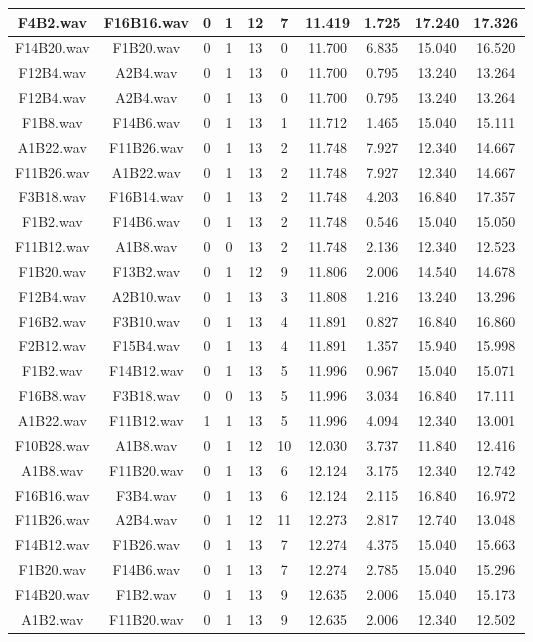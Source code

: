 \documentclass[11pt,a4paper]{book}
\begin{document}
\begin{longtable}[c]{|c|c|c|c|c|c|c|c|c|c|}
F4B2.wav&F16B16.wav&0&1&12&7&11.419&1.725&17.240&17.326\\ \hline
F14B20.wav&F1B20.wav&0&1&13&0&11.700&6.835&15.040&16.520\\ \hline
F12B4.wav&A2B4.wav&0&1&13&0&11.700&0.795&13.240&13.264\\ \hline
F12B4.wav&A2B4.wav&0&1&13&0&11.700&0.795&13.240&13.264\\ \hline
F1B8.wav&F14B6.wav&0&1&13&1&11.712&1.465&15.040&15.111\\ \hline
A1B22.wav&F11B26.wav&0&1&13&2&11.748&7.927&12.340&14.667\\ \hline
F11B26.wav&A1B22.wav&0&1&13&2&11.748&7.927&12.340&14.667\\ \hline
F3B18.wav&F16B14.wav&0&1&13&2&11.748&4.203&16.840&17.357\\ \hline
F1B2.wav&F14B6.wav&0&1&13&2&11.748&0.546&15.040&15.050\\ \hline
F11B12.wav&A1B8.wav&0&0&13&2&11.748&2.136&12.340&12.523\\ \hline
F1B20.wav&F13B2.wav&0&1&12&9&11.806&2.006&14.540&14.678\\ \hline
F12B4.wav&A2B10.wav&0&1&13&3&11.808&1.216&13.240&13.296\\ \hline
F16B2.wav&F3B10.wav&0&1&13&4&11.891&0.827&16.840&16.860\\ \hline
F2B12.wav&F15B4.wav&0&1&13&4&11.891&1.357&15.940&15.998\\ \hline
F1B2.wav&F14B12.wav&0&1&13&5&11.996&0.967&15.040&15.071\\ \hline
F16B8.wav&F3B18.wav&0&0&13&5&11.996&3.034&16.840&17.111\\ \hline
A1B22.wav&F11B12.wav&1&1&13&5&11.996&4.094&12.340&13.001\\ \hline
F10B28.wav&A1B8.wav&0&1&12&10&12.030&3.737&11.840&12.416\\ \hline
A1B8.wav&F11B20.wav&0&1&13&6&12.124&3.175&12.340&12.742\\ \hline
F16B16.wav&F3B4.wav&0&1&13&6&12.124&2.115&16.840&16.972\\ \hline
F11B26.wav&A2B4.wav&0&1&12&11&12.273&2.817&12.740&13.048\\ \hline
F14B12.wav&F1B26.wav&0&1&13&7&12.274&4.375&15.040&15.663\\ \hline
F1B20.wav&F14B6.wav&0&1&13&7&12.274&2.785&15.040&15.296\\ \hline
F14B20.wav&F1B2.wav&0&1&13&9&12.635&2.006&15.040&15.173\\ \hline
A1B2.wav&F11B20.wav&0&1&13&9&12.635&2.006&12.340&12.502\\ \hline

\end{longtable}
\end{document}
